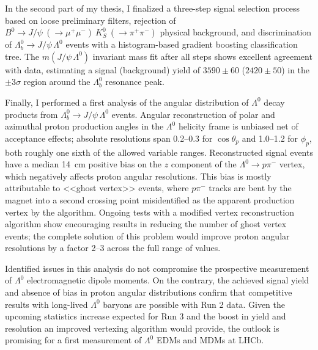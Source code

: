 \documentclass[12pt,a4paper]{book}
\newcommand{\demonstratorshort}{$\Lambda_b^0 \rightarrow J/\psi\,\Lambda^0$\xspace}
\newcommand{\physbkgfull}{$B^0 \rightarrow J/\psi~(\rightarrow \mu^+ \mu^-)~K^0_S~(\rightarrow \pi^+\pi^-)$\xspace}
\newcommand{\lz}{$\Lambda^0$\xspace}
\newcommand{\lbz}{$\Lambda_b^0$\xspace}
\newcommand{\lambdadecay}{$\Lambda^0 \rightarrow p\pi^-$\xspace}
\newcommand{\cthetap}{$\cos\theta_p$\xspace}
\newcommand{\phip}{$\phi_p$\xspace}
\begin{document}
In the second part of my thesis, I finalized a three-step signal selection process based on loose preliminary filters, rejection of \physbkgfull physical background, and discrimination of \demonstratorshort events with a histogram-based gradient boosting classification tree.
The $m(J/\psi\,\Lambda^0)$ invariant mass fit after all steps shows excellent agreement with data, estimating a signal (background) yield of $3590 \pm 60$ ($2420 \pm 50$) in the $\pm3\sigma$ region around the \lbz resonance peak.

Finally, I performed a first analysis of the angular distribution of \lz decay products from \demonstratorshort events.
Angular reconstruction of polar and azimuthal proton production angles in the \lz helicity frame is unbiased net of acceptance effects;
absolute resolutions span 0.2--0.3 for \cthetap and 1.0--1.2 for \phip, both roughly one sixth of the allowed variable ranges.
Reconstructed signal events have a median \SI{14}{\centi\meter} positive bias on the $z$ component of the \lambdadecay vertex, which negatively affects proton angular resolutions.
This bias is mostly attributable to <<ghost vertex>> events, where $p\pi^-$ tracks are bent by the magnet into a second crossing point misidentified as the apparent production vertex by the algorithm.
Ongoing tests with a modified vertex reconstruction algorithm show encouraging results in reducing the number of ghost vertex events;
the complete solution of this problem would improve proton angular resolutions by a factor 2--3 across the full range of values.

Identified issues in this analysis do not compromise the prospective measurement of \lz electromagnetic dipole moments.
On the contrary, the achieved signal yield and absence of bias in proton angular distributions confirm that competitive results with long-lived \lz baryons are possible with Run 2 data.
Given the upcoming statistics increase expected for Run 3 and the boost in yield and resolution an improved vertexing algorithm would provide, the outlook is promising for a first measurement of \lz EDMs and MDMs at LHCb.

\end{document}
